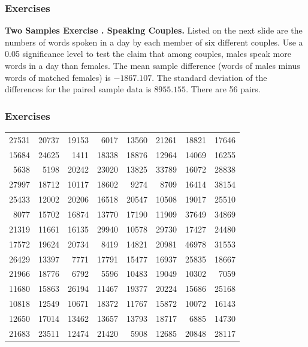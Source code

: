 \documentclass[xcolor=dvipsnames]{beamer}
\newcounter{aufg}
\newcommand{\aufgabe}[1]{\refstepcounter{aufg}\textbf{Two Samples Exercise \arabic{aufg}. #1.}}
\begin{document}
\begin{frame}
  \frametitle{Exercises}
  \aufgabe{Speaking Couples} Listed on the next slide are the numbers
  of words spoken in a day by each member of six different couples.
  Use a 0.05 significance level to test the claim that among couples,
  males speak more words in a day than females. The mean sample
  difference (words of males minus words of matched females) is
  $-1867.107$. The standard deviation of the differences for the
  paired sample data is $8955.155$. There are 56 pairs.
\end{frame}

\begin{frame}
  \frametitle{Exercises}
\begin{tabular}{|rr|rr|rr|rr|}
27531 & 20737 & 19153 &  6017 & 13560 & 21261 & 18821 & 17646 \\
15684 & 24625 &  1411 & 18338 & 18876 & 12964 & 14069 & 16255 \\
 5638 &  5198 & 20242 & 23020 & 13825 & 33789 & 16072 & 28838 \\
27997 & 18712 & 10117 & 18602 &  9274 &  8709 & 16414 & 38154 \\
25433 & 12002 & 20206 & 16518 & 20547 & 10508 & 19017 & 25510 \\
 8077 & 15702 & 16874 & 13770 & 17190 & 11909 & 37649 & 34869 \\
21319 & 11661 & 16135 & 29940 & 10578 & 29730 & 17427 & 24480 \\
17572 & 19624 & 20734 &  8419 & 14821 & 20981 & 46978 & 31553 \\
26429 & 13397 &  7771 & 17791 & 15477 & 16937 & 25835 & 18667 \\
21966 & 18776 &  6792 &  5596 & 10483 & 19049 & 10302 &  7059 \\
11680 & 15863 & 26194 & 11467 & 19377 & 20224 & 15686 & 25168 \\
10818 & 12549 & 10671 & 18372 & 11767 & 15872 & 10072 & 16143 \\
12650 & 17014 & 13462 & 13657 & 13793 & 18717 &  6885 & 14730 \\
21683 & 23511 & 12474 & 21420 &  5908 & 12685 & 20848 & 28117 \\
\end{tabular}
\end{frame}

\end{document}
